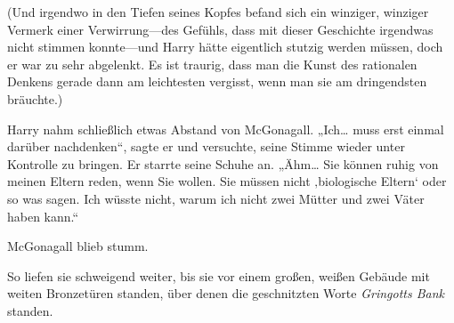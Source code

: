 (Und irgendwo in den Tiefen seines Kopfes befand sich ein winziger, winziger Vermerk einer Verwirrung—des Gefühls, dass mit dieser Geschichte irgendwas nicht stimmen konnte—und Harry hätte eigentlich stutzig werden müssen, doch er war zu sehr abgelenkt. Es ist traurig, dass man die Kunst des rationalen Denkens gerade dann am leichtesten vergisst, wenn man sie am dringendsten bräuchte.)

Harry nahm schließlich etwas Abstand von McGonagall. „Ich… muss erst einmal darüber nachdenken“, sagte er und versuchte, seine Stimme wieder unter Kontrolle zu bringen. Er starrte seine Schuhe an. „Ähm… Sie können ruhig von meinen Eltern reden, wenn Sie wollen. Sie müssen nicht ‚biologische Eltern‘ oder so was sagen. Ich wüsste nicht, warum ich nicht zwei Mütter und zwei Väter haben kann.“

McGonagall blieb stumm.

So liefen sie schweigend weiter, bis sie vor einem großen, weißen Gebäude mit weiten Bronzetüren standen, über denen die geschnitzten Worte \emph{Gringotts Bank} standen.

